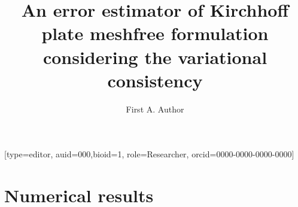 \documentclass[a4paper,fleqn]{cas-sc}
\begin{document}
\let\WriteBookmarks\relax
\def\floatpagepagefraction{1}
\def\textpagefraction{.001}

\title[mode = title]{An error estimator of Kirchhoff plate meshfree formulation considering the variational consistency}

\author[1]{First A. Author}[type=editor,
                        auid=000,bioid=1,
                        role=Researcher,
                        orcid=0000-0000-0000-0000]
\cormark[1]




\maketitle






\section{Numerical results}\label{sec:numerical}



% 
% 
% 
% 





% 
\end{document}
